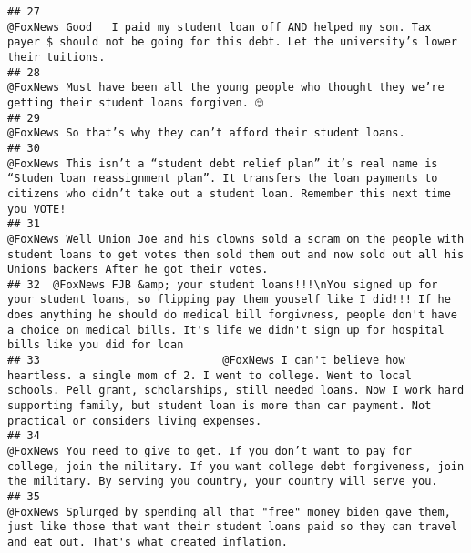 \documentclass[
]{article}
\begin{document}
\begin{verbatim}
## 27                                                                                                                                                 @FoxNews Good   I paid my student loan off AND helped my son. Tax payer $ should not be going for this debt. Let the university’s lower their tuitions.
## 28                                                                                                                                                                                            @FoxNews Must have been all the young people who thought they we’re getting their student loans forgiven. 🙄
## 29                                                                                                                                                                                                                                           @FoxNews So that’s why they can’t afford their student loans.
## 30                                                                                    @FoxNews This isn’t a “student debt relief plan” it’s real name is “Studen loan reassignment plan”. It transfers the loan payments to citizens who didn’t take out a student loan. Remember this next time you VOTE!
## 31                                                                                                                  @FoxNews Well Union Joe and his clowns sold a scram on the people with student loans to get votes then sold them out and now sold out all his Unions backers After he got their votes.
## 32  @FoxNews FJB &amp; your student loans!!!\nYou signed up for your student loans, so flipping pay them youself like I did!!! If he does anything he should do medical bill forgivness, people don't have a choice on medical bills. It's life we didn't sign up for hospital bills like you did for loan
## 33                            @FoxNews I can't believe how heartless. a single mom of 2. I went to college. Went to local schools. Pell grant, scholarships, still needed loans. Now I work hard supporting family, but student loan is more than car payment. Not practical or considers living expenses.
## 34                                                                                                @FoxNews You need to give to get. If you don’t want to pay for college, join the military. If you want college debt forgiveness, join the military. By serving you country, your country will serve you.
## 35                                                                                                                  @FoxNews Splurged by spending all that "free" money biden gave them, just like those that want their student loans paid so they can travel and eat out. That's what created inflation.

\end{verbatim}
\end{document}
